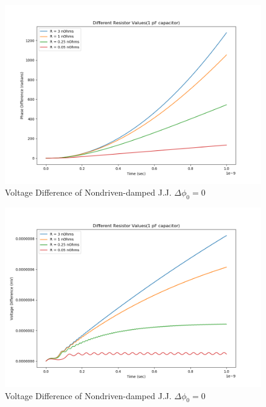 \documentclass[12pt]{article}
\begin{document}
\begin{figure}
\caption{Voltage Difference of Nondriven-damped J.J. $\Delta \phi_0 = 0$}
\begin{center}
\includegraphics[scale=0.60]{dd-jjresphase0.png}
\end{center}
\end{figure}

\begin{figure}
\caption{Voltage Difference of Nondriven-damped J.J. $\Delta \phi_0 = 0$}
\begin{center}
\includegraphics[scale=0.60]{dd-jjresphase0v.png}
\end{center}
\end{figure}
\end{document}
